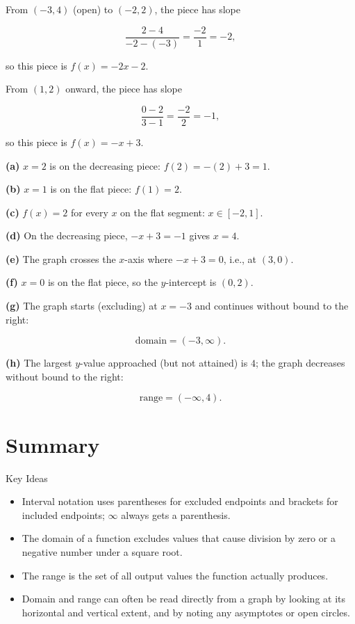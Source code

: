 \documentclass[12pt]{article}
\begin{document}
\begin{solutionbox}
From $(-3,4)$ (open) to $(-2,2)$, the piece has slope

\[
\frac{2-4}{-2-(-3)}=\frac{-2}{1}=-2,
\]

so this piece is $f(x)=-2x-2$.

From $(1,2)$ onward, the piece has slope

\[
\frac{0-2}{3-1}=\frac{-2}{2}=-1,
\]

so this piece is $f(x)=-x+3$.

\textbf{(a)} $x=2$ is on the decreasing piece: $f(2)=-(2)+3=1$.

\textbf{(b)} $x=1$ is on the flat piece: $f(1)=2$.

\textbf{(c)} $f(x)=2$ for every $x$ on the flat segment: $x\in[-2,1]$.

\textbf{(d)} On the decreasing piece, $-x+3=-1$ gives $x=4$.

\textbf{(e)} The graph crosses the $x$-axis where $-x+3=0$, i.e., at $(3,0)$.

\textbf{(f)} $x=0$ is on the flat piece, so the $y$-intercept is $(0,2)$.

\textbf{(g)} The graph starts (excluding) at $x=-3$ and continues without bound to the right:

\[
\text{domain}=(-3,\infty).
\]

\textbf{(h)} The largest $y$-value approached (but not attained) is $4$; the graph decreases without bound to the right:

\[
\text{range}=(-\infty,4).
\]
\end{solutionbox}

  

\section*{Summary}

\begin{friendlyrule}{Key Ideas}
\begin{itemize}
    \item Interval notation uses parentheses for excluded endpoints and brackets for included endpoints; $\infty$ always gets a parenthesis.
    \item The domain of a function excludes values that cause division by zero or a negative number under a square root.
    \item The range is the set of all output values the function actually produces.
    \item Domain and range can often be read directly from a graph by looking at its horizontal and vertical extent, and by noting any asymptotes or open circles.
\end{itemize}
\end{friendlyrule}
\end{document}
